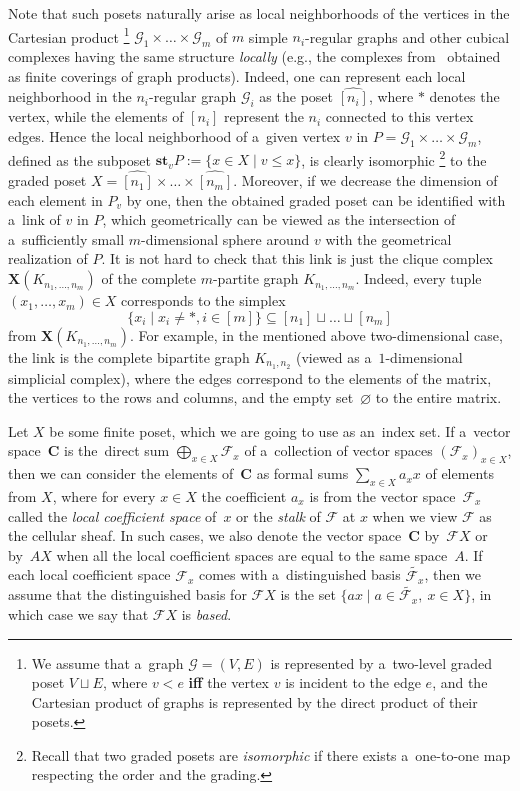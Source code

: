 \documentclass[11pt]{article}
\newcommand{\Iff}{\textbf{if\textcompwordmark f} }
\newcommand{\st}{\mathbf{st}}
\let\le\leqslant
\theoremstyle{plain}
\theoremstyle{definition}
\theoremstyle{remark}
\newcommand{\cG}{\mathcal{G}}
\newcommand{\cF}{\mathcal{F}}
\newcommand{\sC}{{\mathbf{C}}}
\begin{document}
Note that such posets naturally arise as local neighborhoods of the vertices in the Cartesian product%
    \footnote{We assume that a~graph $\cG = (V,E)$ is represented by a~two-level graded poset $V\sqcup E$, where $v < e$ \Iff the vertex $v$ is incident to the edge $e$, and the Cartesian product of graphs is represented by the direct product of their posets.} 
$\cG_1\times \dots \times \cG_m$ of $m$ simple $n_i$-regular graphs and other cubical complexes having the same structure \emph{locally} (e.g., the complexes from~\cite{Panteleev&Kalachev:stoc2022} obtained as finite coverings of graph products). Indeed, one can represent each local neighborhood in the $n_i$-regular graph $\cG_i$ as the poset 
$\widehat{[n_i]}$, where $*$ denotes the vertex, while the elements of $[n_i]$ represent the $n_i$ connected to this vertex edges. Hence the local neighborhood of a~given vertex $v$ in $P = \cG_1\times \dots \times \cG_m$, defined as the subposet $\st_v P := \{x \in X \mid v \le x\}$, is clearly isomorphic%
\footnote{Recall that two graded posets are \emph{isomorphic} if there exists a~one-to-one map respecting the order and the grading.} 
to the graded poset $X = \widehat{[n_1]}\times\dots\times \widehat{[n_m]}$. Moreover, if we decrease the dimension of each element in $P_v$ by one, then the obtained graded poset can be identified with a~link of $v$ in $P$, which geometrically can be viewed as the intersection of a~sufficiently small $m$-dimensional sphere around $v$ with the geometrical realization of $P$. It is not hard to check that this link is just the clique complex $\mathbf{X}(K_{n_1,\dots,n_m})$ of the complete $m$-partite graph $K_{n_1,\dots,n_m}$. Indeed, every tuple $(x_1,\dots,x_m)\in X$ corresponds to the simplex 
\[\{x_i \mid x_i\ne * , i \in [m]\} \subseteq [n_1]\sqcup \dots \sqcup [n_m]\] 
from $\mathbf{X}(K_{n_1,\dots,n_m})$. For example, in the mentioned above two-dimensional case, the link is the complete bipartite graph $K_{n_1,n_2}$ (viewed as a~$1$-dimensional simplicial complex), where the edges correspond to the elements of the matrix, the vertices to the rows and columns, and the empty set~$\varnothing$ to the entire matrix.  



Let $X$ be some finite poset, which we are going to use as an~index set. If a~vector space~$\sC$ is the~direct sum $\bigoplus_{x\in X} \cF_x$ of a~collection of vector spaces $(\cF_x)_{x\in X}$, then we can consider the elements of~$\sC$ as formal sums $\sum_{x\in X} a_x x$ of elements from $X$, where for every $x\in X$ the coefficient $a_x$ is from the vector space~$\cF_x$ called the \emph{local coefficient space} of~$x$ or the \emph{stalk} of $\cF$ at $x$ when we view $\cF$ as the cellular sheaf. In such cases, we also denote the vector space~$\sC$ by~$\cF X$ or by~$A X$ when all the local coefficient spaces are equal to the same space~$A$. If each local coefficient space $\cF_x$ comes with a~distinguished basis $\tilde{\cF_x}$, then we assume that the distinguished basis for $\cF X$ is the set $\{ax \mid a\in \tilde{\cF_x},\ x\in X \}$, in which case we say that $\cF X$ is \emph{based}.
\end{document}
